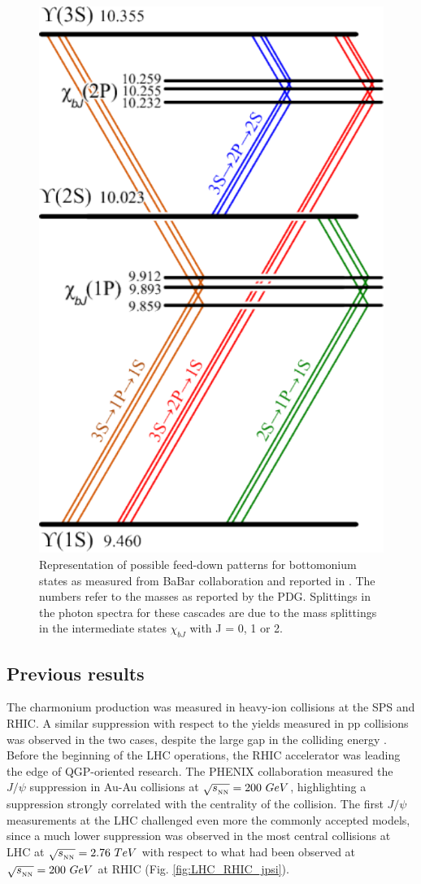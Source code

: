 \begin{figure}[!t]
\begin{center}
\includegraphics[width=0.45\linewidth]{Chapters/Analysis/Figs/BottomoniumSpectro.pdf}
\caption{Representation of possible feed-down patterns for bottomonium states as measured from BaBar collaboration and reported in \cite{Lees:2014qea}. The numbers refer to the masses as reported by the PDG. Splittings in the photon spectra for these cascades are due to the mass splittings in the intermediate states $\chi_{bJ}$ with J = 0, 1 or 2.}
\label{fig:BBSpectro}
\end{center}
\end{figure}

\subsection{Previous results}

The charmonium production was measured in heavy-ion collisions at the SPS and RHIC. 
A similar suppression with respect to the yields measured in pp collisions was observed in the two cases, despite the large gap in the colliding energy \cite{Rapp:2017chc}.
Before the beginning of the LHC operations, the RHIC accelerator was leading the edge of QGP-oriented research.
The PHENIX collaboration measured the $J/\psi$ suppression in Au-Au collisions at $\sqrt{s_{_{\rm NN}}}=200\ GeV$, highlighting a suppression strongly correlated with the centrality of the collision.
The first $J/\psi$ measurements at the LHC challenged even more the commonly accepted models, since a much lower suppression was observed in the most central collisions at LHC at $\sqrt{s_{_{\rm NN}}}=2.76\ TeV$ with respect to what had been observed at $\sqrt{s_{_{\rm NN}}}=200\ GeV$ at RHIC (Fig. \ref{fig:LHC_RHIC_jpsi}).

